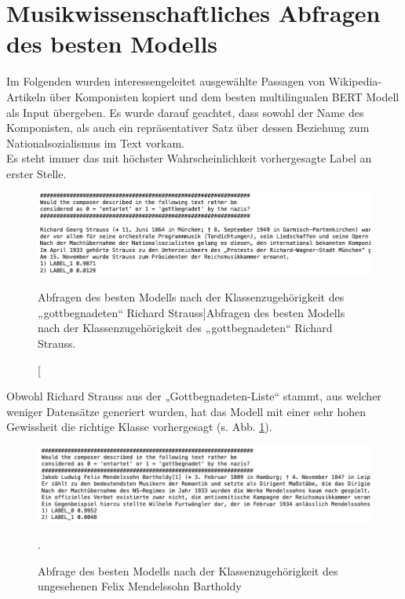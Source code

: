 \documentclass[ngerman]{ttlab-qualify}
\begin{document}
\section{Musikwissenschaftliches Abfragen des besten Modells}
Im Folgenden wurden interessengeleitet ausgewählte Passagen von Wikipedia-Artikeln über Komponisten kopiert und dem besten multilingualen BERT Modell als Input übergeben. Es wurde darauf geachtet, dass sowohl der Name des Komponisten, als auch ein repräsentativer Satz über dessen Beziehung zum Nationalsozialismus im Text vorkam.\\
Es steht immer das mit höchster Wahrscheinlichkeit vorhergesagte Label an erster Stelle.
\begin{figure}[H]
\begin{center}
\includegraphics[width=16cm]{grafiken/Abfrage_Strauss.png}
\caption[Abfragen des besten Modells nach der Klassenzugehörigkeit des „gottbegnadeten“ Richard Strauss]{Abfragen des besten Modells nach der Klassenzugehörigkeit des „gottbegnadeten“ Richard Strauss}.
\label{strauss_abfrage}
\end{center}
\end{figure}
\noindent Obwohl Richard Strauss aus der „Gottbegnadeten-Liste“ stammt, aus welcher weniger Datensätze generiert wurden, hat das Modell mit einer sehr hohen Gewissheit die richtige Klasse vorhergesagt (s. Abb. \ref{strauss_abfrage}).
\begin{figure}[H]
\begin{center}
\includegraphics[width=16cm]{grafiken/Abfrage_Mendelssohn.png}
\caption[Abfrage des besten Modells nach der Klassenzugehörigkeit des ungesehenen Felix Mendelssohn Bartholdy]{Abfrage des besten Modells nach der Klassenzugehörigkeit des ungesehenen Felix Mendelssohn Bartholdy}.
\label{mendelssohn_abfrage}
\end{center}
\end{figure}
\end{document}

